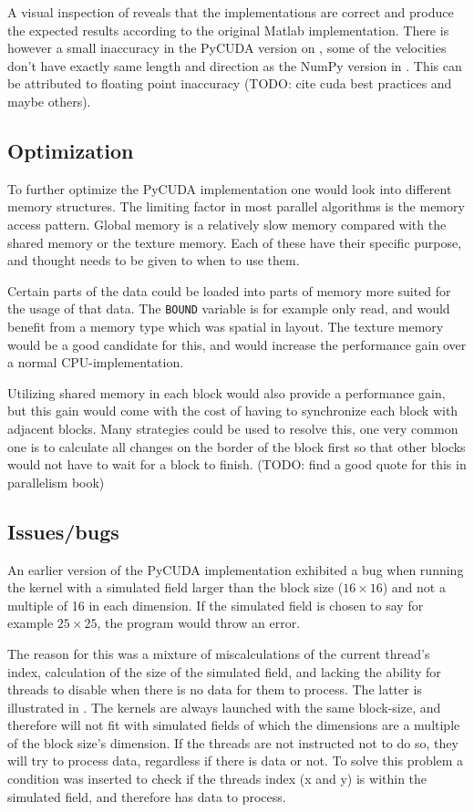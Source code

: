 A visual inspection of  reveals that the implementations are correct and produce the expected results according to the original Matlab implementation. There is however a small inaccuracy in the PyCUDA version on , some of the velocities don't have exactly same length and direction as the NumPy version in . This can be attributed to floating point inaccuracy (TODO: cite cuda best practices and maybe others).



\subsection{Optimization}
To further optimize the PyCUDA implementation one would look into different memory structures. The limiting factor in most parallel algorithms is the memory access pattern. Global memory is a relatively slow memory compared with the shared memory or the texture memory. Each of these have their specific purpose, and thought needs to be given to when to use them.

Certain parts of the data could be loaded into parts of memory more suited for the usage of that data. The \texttt{BOUND} variable is for example only read, and would benefit from a memory type which was spatial in layout. The texture memory would be a good candidate for this, and would increase the performance gain over a normal CPU-implementation.

Utilizing shared memory in each block would also provide a performance gain, but this gain would come with the cost of having to synchronize each block with adjacent blocks. Many strategies could be used to resolve this, one very common one is to calculate all changes on the border of the block first so that other blocks would not have to wait for a block to finish. (TODO: find a good quote for this in parallelism book)



\subsection{Issues/bugs}
An earlier version of the PyCUDA implementation exhibited a bug when running the kernel with a simulated field larger than the block size ($16\times16$) and not a multiple of 16 in each dimension. If the simulated field is chosen to say for example $25\times25$, the program would throw an error.

The reason for this was a mixture of miscalculations of the current thread's index, calculation of the size of the simulated field, and lacking the ability for threads to disable when there is no data for them to process. The latter is illustrated in . The kernels are always launched with the same block-size, and therefore will not fit with simulated fields of which the dimensions are a multiple of the block size's dimension. If the threads are not instructed not to do so, they will try to process data, regardless if there is data or not. To solve this problem a condition was inserted to check if the threads index (x and y) is within the simulated field, and therefore has data to process. 

